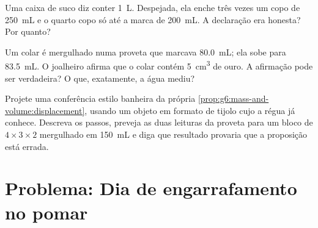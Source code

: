 \begin{exercise}[$\star\star$]\label{exo:g6:mass-and-volume:10}
Uma caixa de suco diz conter \qty{1}{L}. Despejada, ela enche três
vezes um copo de \qty{250}{mL} e o quarto copo só até a marca de
\qty{200}{mL}. A declaração era honesta? Por quanto?
\end{exercise}

\begin{exercise}[$\star\star$]\label{exo:g6:mass-and-volume:11}
Um colar é mergulhado numa proveta que marcava \qty{80.0}{mL}; ela
sobe para \qty{83.5}{mL}. O joalheiro afirma que o colar contém
\qty{5}{cm^3} de ouro. A afirmação pode ser verdadeira? O que,
exatamente, a água mediu?
\end{exercise}

\begin{exercise}[$\star\star\star$]\label{exo:g6:mass-and-volume:12}
Projete uma conferência estilo banheira da própria
\cref{prop:g6:mass-and-volume:displacement}, usando um objeto em
formato de tijolo cujo  a régua já conhece. Descreva os passos,
preveja as duas leituras da proveta para um bloco de
$4 \times 3 \times 2$  mergulhado em \qty{150}{mL} e diga
que resultado provaria que a proposição está errada.
\end{exercise}

\section{Problema: Dia de engarrafamento no pomar}

